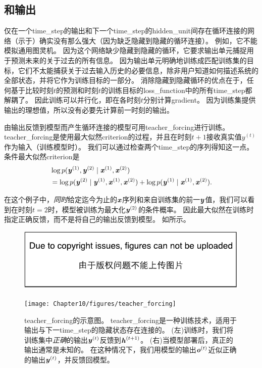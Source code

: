 
\subsection{和输出}
\label{sec:teacher_forcing_and_networks_with_output_recurrence}
仅在一个\gls{time_step}的输出和下一个\gls{time_step}的\gls{hidden_unit}间存在循环连接的网络（示于）确实没有那么强大（因为缺乏隐藏到隐藏的循环连接）。
例如，它不能模拟通用图灵机。
因为这个网络缺少隐藏到隐藏的循环，它要求输出单元捕捉用于预测未来的关于过去的所有信息。
因为输出单元明确地训练成匹配训练集的目标，它们不太能捕获关于过去输入历史的必要信息，除非用户知道如何描述系统的全部状态，并将它作为训练目标的一部分。
消除隐藏到隐藏循环的优点在于，任何基于比较时刻$t$的预测和时刻$t$的训练目标的\gls{loss_function}中的所有\gls{time_step}都解耦了。
因此训练可以并行化，即在各时刻$t$分别计算\gls{gradient}。
因为训练集提供输出的理想值，所以没有必要先计算前一时刻的输出。

由输出反馈到模型而产生循环连接的模型可用\gls{teacher_forcing}进行训练。
\gls{teacher_forcing}是使用最大似然\gls{criterion}的过程，并且在时刻$t+1$接收真实值$y^{(t)}$作为输入（训练模型时）。
我们可以通过检查两个\gls{time_step}的序列得知这一点。
条件最大似然\gls{criterion}是
\begin{align}
 &\log p(\boldsymbol{\mathit{y}}^{(1)},\boldsymbol{\mathit{y}}^{(2)} \mid \boldsymbol{\mathit{x}}^{(1)}, \boldsymbol{\mathit{x}}^{(2)} ) \\
 &= \log  p(\boldsymbol{\mathit{y}}^{(2)} \mid \boldsymbol{\mathit{y}}^{(1)}, \boldsymbol{\mathit{x}}^{(1)}, \boldsymbol{\mathit{x}}^{(2)} )  + \log p(\boldsymbol{\mathit{y}}^{(1)} \mid \boldsymbol{\mathit{x}}^{(1)}, \boldsymbol{\mathit{x}}^{(2)}) .
\end{align}


在这个例子中，\emph{同时}给定迄今为止的$\boldsymbol{\mathit{x}}$序列和来自训练集的前一$\boldsymbol{\mathit{y}}$值，我们可以看到在时刻$t=2$时，模型被训练为最大化$\boldsymbol{\mathit{y}}^{(2)}$的条件概率。
因此最大似然在训练时指定正确反馈，而不是将自己的输出反馈到模型。
如所示。
\begin{figure}[!htb]
\ifOpenSource
\centerline{\includegraphics{figure.pdf}}
\else
\centerline{\texttt{[image: Chapter10/figures/teacher\_forcing]}}
\fi
\caption{\gls{teacher_forcing}的示意图。
\gls{teacher_forcing}是一种训练技术，适用于输出与下一\gls{time_step}的隐藏状态存在连接的。
(左)训练时，我们将训练集中\emph{正确}的输出$\boldsymbol{\mathit{y}}^{(t)}$反馈到$\boldsymbol{\mathit{h}}^{(t+1)}$。
(右)当模型部署后，真正的输出通常是未知的。
在这种情况下，我们用模型的输出$\boldsymbol{\mathit{o}}^{(t)}$近似正确的输出$\boldsymbol{\mathit{y}}^{(t)}$，并反馈回模型。
}
\label{fig:chap10_teacher_forcing}
\end{figure}

